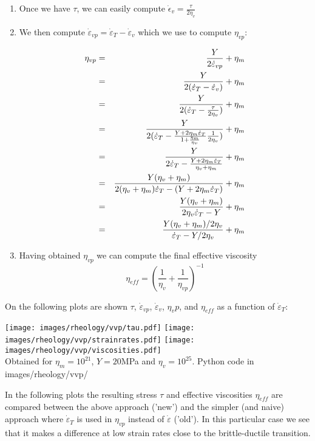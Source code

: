 \begin{enumerate}
\item Once we have $\tau$, we can easily compute $\dot\epsilon_v = \frac{\tau}{2\eta_v}$

\item We then compute $\dot\varepsilon_{vp} = \dot\varepsilon_T- \dot\varepsilon_v$ which 
we use to compute $\eta_{vp}$:

\begin{eqnarray}
\eta_{vp} 
&=& \frac{Y}{2\dot\varepsilon_{vp}}+\eta_m \nonumber\\
&=& \frac{Y}{2(\dot\varepsilon_{T}-\dot\varepsilon_{v})}+\eta_m \nonumber\\
&=& \frac{Y}{2(\dot\varepsilon_{T}-\frac{\tau}{2\eta_v})}+\eta_m \nonumber\\
&=& \frac{Y}{2(\dot\varepsilon_{T}- \frac{Y + 2 \eta_m \dot\varepsilon_T} {1+ \frac{\eta_m}{\eta_v} }   
\frac{1}{2\eta_v})}+\eta_m \nonumber\\
&=& \frac{Y}{2\dot\varepsilon_{T}- \frac{Y + 2 \eta_m \dot\varepsilon_T} {\eta_v + \eta_m}     }+\eta_m \\
&=& \frac{Y(\eta_v+\eta_m)}{2(\eta_v+\eta_m) \dot\varepsilon_{T}- (Y + 2 \eta_m \dot\varepsilon_T) }+\eta_m \\
&=& \frac{Y(\eta_v+\eta_m)}{2 \eta_v \dot\varepsilon_{T}- Y  }+\eta_m \\
&=& \frac{Y(\eta_v+\eta_m)/2\eta_v}{ \dot\varepsilon_{T}- Y/2\eta_v  }+\eta_m 
\end{eqnarray}


\item Having obtained $\eta_{vp}$ we can compute the final effective viscosity
\[
\eta_{eff} = \left( \frac{1}{\eta_v}  + \frac{1}{\eta_{vp}}  \right)^{-1}
\]
\end{enumerate}

On the following plots are shown $\tau$, 
$\dot\varepsilon_{vp}$, $\dot\varepsilon_v$, $\eta_vp$, and $\eta_{eff}$ 
as a function of  $\dot\varepsilon_T$: 

\begin{center}
\texttt{[image: images/rheology/vvp/tau.pdf]}
\texttt{[image: images/rheology/vvp/strainrates.pdf]}
\texttt{[image: images/rheology/vvp/viscosities.pdf]}\\
{\captionfont Obtained for $\eta_m=10^{21}$, $Y=20$MPa and $\eta_v=10^{25}$. Python code 
in images/rheology/vvp/}
\end{center}

In the following plots the resulting stress $\tau$ and effective viscosities $\eta_{eff}$
are compared between the above approach ('new') and the simpler (and naive) 
approach where $\dot\varepsilon_T$ 
is used in $\eta_{vp}$ instead of $\dot\varepsilon$ ('old'). In this particular case 
we see that it makes a difference at low strain rates close to the brittle-ductile transition.

